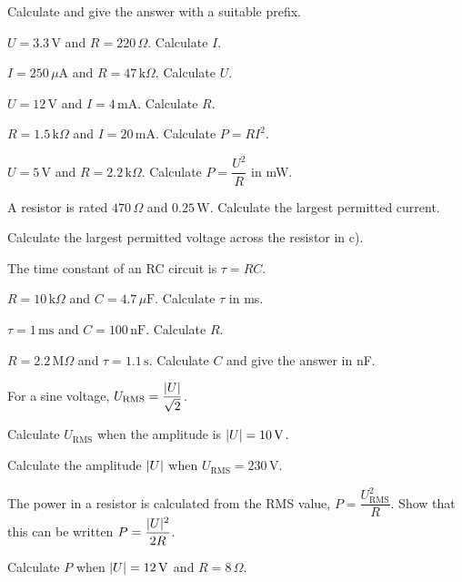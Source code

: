 Calculate and give the answer with a suitable prefix.
\begin{parts}
  \item $U = 3.3\,\text{V}$ and $R = 220\,\Omega$. Calculate $I$.
  \item $I = 250\,\mu\text{A}$ and $R = 47\,\text{k}\Omega$. Calculate $U$.
  \item $U = 12\,\text{V}$ and $I = 4\,\text{mA}$. Calculate $R$.
\end{parts}

\begin{parts}
  \item $R = 1.5\,\text{k}\Omega$ and $I = 20\,\text{mA}$. Calculate $P = RI^2$.
  \item $U = 5\,\text{V}$ and $R = 2.2\,\text{k}\Omega$. Calculate $P = \dfrac{U^2}{R}$ in mW.
  \item A resistor is rated $470\,\Omega$ and $0.25\,\text{W}$. Calculate the largest permitted
    current.
  \item Calculate the largest permitted voltage across the resistor in c).
\end{parts}

The time constant of an RC circuit is $\tau = RC$.
\begin{parts}
  \item $R = 10\,\text{k}\Omega$ and $C = 4.7\,\mu\text{F}$. Calculate $\tau$ in ms.
  \item $\tau = 1\,\text{ms}$ and $C = 100\,\text{nF}$. Calculate $R$.
  \item $R = 2.2\,\text{M}\Omega$ and $\tau = 1.1\,\text{s}$. Calculate $C$ and give the answer in
    nF.
\end{parts}

For a sine voltage, $U_{\text{RMS}} = \dfrac{\lvert U\rvert}{\sqrt{2}}$.
\begin{parts}
  \item Calculate $U_{\text{RMS}}$ when the amplitude is $\lvert U\rvert = 10\,\text{V}$.
  \item Calculate the amplitude $\lvert U\rvert$ when $U_{\text{RMS}} = 230\,\text{V}$.
  \item The power in a resistor is calculated from the RMS value, $P = \dfrac{U_{\text{RMS}}^2}{R}$.
    Show that this can be written $P = \dfrac{\lvert U\rvert^2}{2R}$.
  \item Calculate $P$ when $\lvert U\rvert = 12\,\text{V}$ and $R = 8\,\Omega$.
\end{parts}

